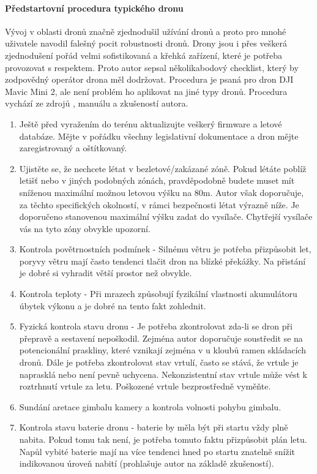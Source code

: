 \paragraph{Předstartovní procedura typického dronu}
Vývoj v oblasti dronů značně zjednodušil užívání dronů a proto pro mnohé uživatele navodil falešný pocit robustnosti dronů. Drony jsou i přes veškerá zjednodušení pořád velmi sofistikovaná a křehká zařízení, které je potřeba provozovat s respektem. Proto autor sepsal několikabodový checklist, který by zodpovědný operátor drona měl dodržovat.  Procedura je psaná pro dron DJI Mavic Mini 2, ale není problém ho aplikovat na jiné typy dronů. Procedura vychází ze zdrojů \cite{PreflightChecklistPdf,PreflightChecklistSaftyCulture}, manuálu \cite{PreflightChecklistDJI} a zkušeností autora. 
\begin{enumerate}
    \item Ještě před vyražením do terénu aktualizujte veškerý firmware a letové databáze. Mějte v pořádku všechny legislativní dokumentace a dron mějte zaregistrovaný a oštítkovaný.
    \item Ujistěte se, že nechcete létat v bezletové/zakázané zóně. Pokud létáte poblíž letišť nebo v jiných podobných zónách, pravděpodobně budete muset mít sníženou maximální možnou letovou výšku na 80m. Autor však doporučuje, za těchto specifických okolností, v rámci bezpečnosti létat výrazně níže. Je doporučeno stanovenou maximální výšku zadat do vysílače. Chytřejší vysílače vás na tyto zóny obvykle upozorní. 
    \item Kontrola povětrnostních podmínek - Silnému větru je potřeba přizpůsobit let, poryvy větru mají často tendenci tlačit dron na blízké překážky. Na přistání je dobré si vyhradit větší prostor než obvykle.
    \item Kontrola teploty - Při mrazech způsobují fyzikální vlastnosti akumulátoru úbytek výkonu a je dobré na tento fakt zohlednit.
    \item Fyzická kontrola stavu dronu - Je potřeba zkontrolovat zda-li se dron při přepravě a sestavení nepoškodil. Zejména autor doporučuje soustředit se na potencionální praskliny, které vznikají zejména v u kloubů ramen skládacích dronů. Dále je potřeba zkontrolovat stav vrtulí, často se stává, že vrtule je naprasklá nebo není pevně uchycena. Nekonzistentní stav vrtule může vést k roztrhnutí vrtule za letu. Poškozené vrtule bezprostředně vyměňte.
    \item Sundání aretace gimbalu kamery a kontrola volnosti pohybu gimbalu.
    \item Kontrola stavu baterie dronu - baterie by měla být při startu vždy plně nabita. Pokud tomu tak není, je potřeba tomuto faktu přizpůsobit plán letu. Napůl vybité baterie mají na více tendenci hned po startu znatelně snížit indikovanou úroveň nabití (prohlašuje autor na základě zkušeností).

\end{enumerate}
